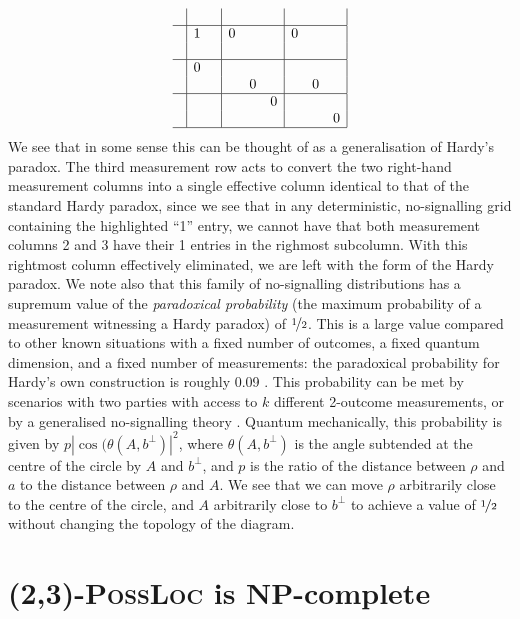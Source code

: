 \documentclass[reprint]{revtex4-1}
\theoremstyle{definition}
\begin{document}
\begin{equation*}
\begin{array}{ c | c c | c c c| c c c|}
&&&&&&&& \\ \hline
&1&&0&&&0&&\\
   &&&&&&&&\\ \hline
   &0&&&&&&&\\ 
  &&&&0&&&0&\\ \hline
  &&&&&0&&&\\ 
  &&&&&&&&0\\ \hline
\end{array}
\end{equation*}
We see that in some sense this can be thought of as a generalisation of Hardy's paradox. The third measurement row acts to convert the two right-hand measurement columns into a single effective column identical to that of the standard Hardy paradox, since we see that in any deterministic, no-signalling grid containing the highlighted ``1'' entry, we cannot have that both measurement columns 2 and 3 have their 1 entries in the righmost subcolumn. With this rightmost column effectively eliminated, we are left with the form of the Hardy paradox. We note also that this family of no-signalling distributions has a supremum value of the \emph{paradoxical probability} (the maximum probability of a measurement witnessing a Hardy paradox) of $\nicefrac{1}{2}$. This is a large value compared to other known situations with a fixed number of outcomes, a fixed quantum dimension, and a fixed number of measurements: the paradoxical probability for Hardy's own construction is roughly 0.09 \cite{Hard1993}. This probability can be met by scenarios with two parties with access to $k$ different 2-outcome measurements, or by a generalised no-signalling theory \cite{Mans2017}. Quantum mechanically, this probability is given by $p|\cos(\theta(A, b^\perp)|^2$, where $\theta(A, b^\perp)$ is the angle subtended at the centre of the circle by $A$ and $b^\perp$, and $p$ is the ratio of the distance between $\rho$ and $a$ to the distance between $\rho$ and $A$. We see that we can move $\rho$ arbitrarily close to the centre of the circle, and $A$ arbitrarily close to $b^\perp$ to achieve a value of $\nicefrac12$ without changing the topology of the diagram.


\section{\textsc{(2,3)-PossLoc} is \textbf{NP}-complete}
\end{document}
